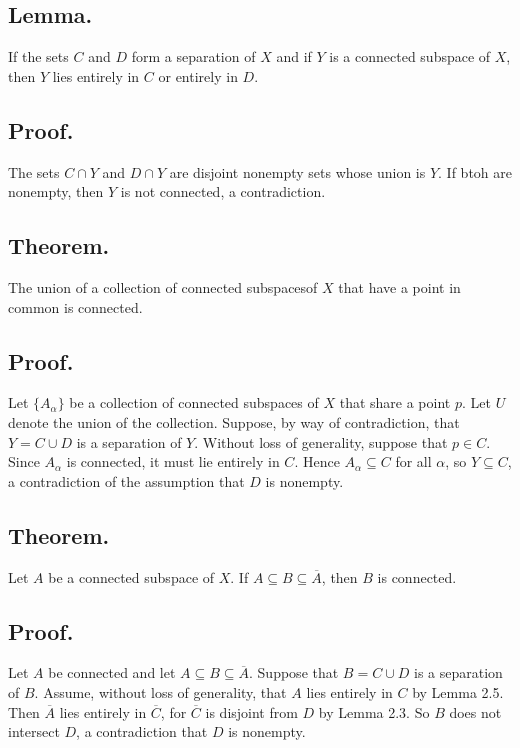 \documentclass[titlepage]{article}
\begin{document}
\subsection{Lemma.} If the sets $C$ and $D$ form a separation of $X$ and if $Y$ is a connected subspace of $X$, then $Y$ lies entirely in $C$ or entirely in $D$.

\subsection{Proof.} The sets $C \cap Y$ and $D \cap Y$ are disjoint nonempty sets whose union is $Y$. If btoh are nonempty, then $Y$ is not connected, a contradiction.

\subsection{Theorem.} The union of a collection of connected subspacesof $X$ that have a point in common is connected.

\subsection{Proof.} Let $\{A_{\alpha}\}$ be a collection of connected subspaces of $X$ that share a point $p$. Let $U$ denote the union of the collection. Suppose, by way of contradiction, that $Y = C \cup D$ is a separation of $Y$. Without loss of generality, suppose that $p \in C$. Since $A_{\alpha}$ is connected, it must lie entirely in $C$. Hence $A_{\alpha} \subseteq C$ for all $\alpha$, so $Y \subseteq C$, a contradiction of the assumption that $D$ is nonempty.

\subsection{Theorem.} Let $A$ be a connected subspace of $X$. If $A \subseteq B \subseteq \overline{A}$, then $B$ is connected.

\subsection{Proof.} Let $A$ be connected and let $A \subseteq B \subseteq \overline{A}$. Suppose that $B = C \cup D$ is a separation of $B$. Assume, without loss of generality, that $A$ lies entirely in $C$ by Lemma 2.5. Then $\overline{A}$ lies entirely in $\overline{C}$, for $\overline{C}$ is disjoint from $D$ by Lemma 2.3. So $B$ does not intersect $D$, a contradiction that $D$ is nonempty.
\end{document}
